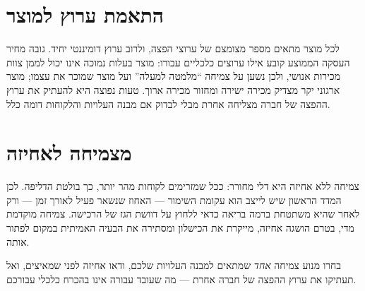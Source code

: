 \section{התאמת ערוץ למוצר}

לכל מוצר מתאים מספר מצומצם של ערוצי הפצה, ולרוב ערוץ דומיננטי יחיד. גובה מחיר
העסקה הממוצע קובע אילו ערוצים כלכליים עבורו: מוצר בעלות נמוכה אינו יכול לממן
צוות מכירות אנושי, ולכן נשען על צמיחה ``מלמטה למעלה''  ועל
מוצר שמוכר את עצמו; מוצר ארגוני יקר מצדיק מכירה ישירה ומחזור מכירה ארוך. טעות
נפוצה היא להעתיק את ערוץ ההפצה של חברה מצליחה אחרת מבלי לבדוק אם מבנה העלויות
והלקוחות דומה כלל.

\section{מצמיחה לאחיזה}

צמיחה ללא אחיזה  היא דלי מחורר: ככל שמזרימים לקוחות מהר יותר,
כך בולטת הדליפה. לכן המדד הראשון שיש לייצב הוא עקומת השימור — האחוז שנשאר פעיל
לאורך זמן — ורק לאחר שהיא משתטחת ברמה בריאה כדאי ללחוץ על דוושת הגז של הרכישה.
צמיחה מוקדמת מדי, בטרם הושגה אחיזה, מייקרת את הכישלון ומסתירה את הבעיה האמיתית
במקום לפתור אותה.

\begin{takeaway}
בחרו מנוע צמיחה \emph{אחד} שמתאים למבנה העלויות שלכם, ודאו אחיזה לפני שמאיצים,
ואל תעתיקו את ערוץ ההפצה של חברה אחרת — מה שעובד עבורה אינו בהכרח כלכלי עבורכם.
\end{takeaway}
